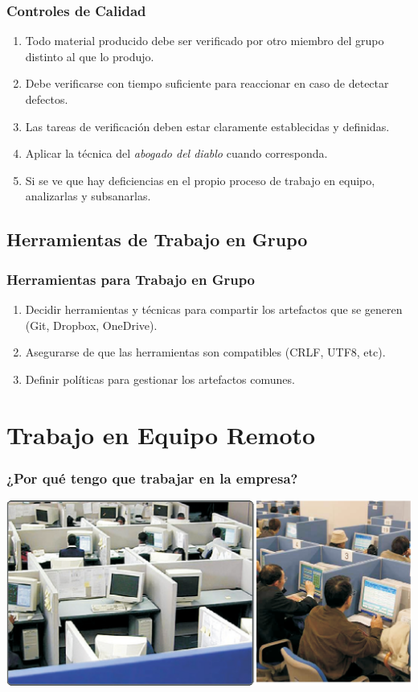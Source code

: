 \documentclass[a4paper,slidestop,xcolor=pst,dvips,blue]{beamer}
\begin{document}
\begin{frame}[c]
	\frametitle{Controles de Calidad}
	\begin{enumerate}[<+->]
		\item Todo material producido debe ser verificado por otro miembro del grupo distinto al que lo produjo.
		\item Debe verificarse con tiempo suficiente para reaccionar en caso de detectar defectos.
		\item Las tareas de verificación deben estar claramente establecidas y definidas.
		\item Aplicar la técnica del \emph{abogado del diablo} cuando corresponda.
		\item Si se ve que hay deficiencias en el propio proceso de trabajo en equipo, analizarlas y subsanarlas.
	\end{enumerate}
\end{frame}

\subsection{Herramientas de Trabajo en Grupo}

\begin{frame}[c]
	\frametitle{Herramientas para Trabajo en Grupo}
	\begin{enumerate}[<+->]
		\item Decidir herramientas y técnicas para compartir los artefactos que se generen (Git, Dropbox, OneDrive).
		\item Asegurarse de que las herramientas son compatibles (CRLF, UTF8, etc).
		\item Definir políticas para gestionar los artefactos comunes.
	\end{enumerate}
\end{frame}

\section{Trabajo en Equipo Remoto}

\begin{frame}[c]
	\frametitle{¿Por qué tengo que trabajar en la empresa?}
	\begin{center}
\includegraphics[width=\linewidth,keepaspectratio=true]{images/realidad.eps}
	\end{center}
\end{frame}
\end{document}
